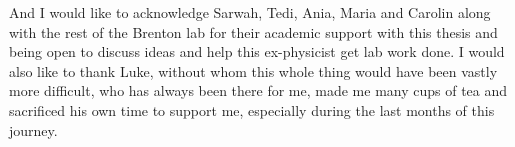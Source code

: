 
\begin{acknowledgements}      


And I would like to acknowledge Sarwah, Tedi, Ania, Maria and Carolin along with the rest of the Brenton lab for their academic support with this thesis and being open to discuss ideas and help this ex-physicist get lab work done. I would also like to thank Luke, without whom this whole thing would have been vastly more difficult, who has always been there for me, made me many cups of tea and sacrificed his own time to support me, especially during the last months of this journey.


\end{acknowledgements}
